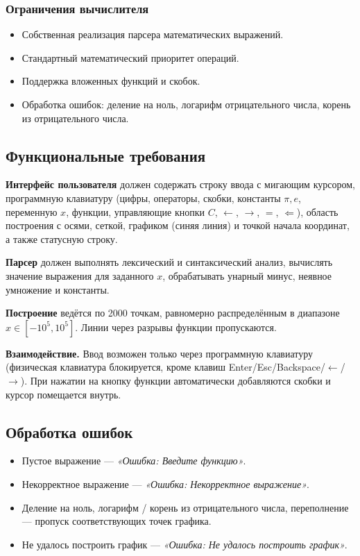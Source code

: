 \documentclass[a4paper, final]{article}
\begin{document}
\subsubsection*{Ограничения вычислителя}

\begin{itemize}
    \item Собственная реализация парсера математических выражений.
    \item Стандартный математический приоритет операций.
    \item Поддержка вложенных функций и скобок.
    \item Обработка ошибок: деление на ноль, логарифм отрицательного
          числа, корень из отрицательного числа.
\end{itemize}

\subsection{Функциональные требования}

\textbf{Интерфейс пользователя} должен содержать строку ввода
с мигающим курсором, программную клавиатуру (цифры, операторы, скобки,
константы $\pi, e$, переменную $x$, функции, управляющие кнопки
$C$, $\leftarrow$, $\to$, $=$, $\Leftarrow$), область построения
с осями, сеткой, графиком (синяя линия) и точкой начала координат,
а также статусную строку.

\textbf{Парсер} должен выполнять лексический и синтаксический анализ,
вычислять значение выражения для заданного $x$, обрабатывать унарный
минус, неявное умножение и константы.

\textbf{Построение} ведётся по 2000 точкам, равномерно распределённым
в диапазоне $x \in [-10^5, 10^5]$. Линии через разрывы функции
пропускаются.

\textbf{Взаимодействие.} Ввод возможен только через программную клавиатуру
(физическая клавиатура блокируется, кроме клавиш Enter/Esc/Backspace/$\leftarrow$/$\to$).
При нажатии на кнопку функции автоматически добавляются скобки и курсор
помещается внутрь.

\subsection{Обработка ошибок}

\begin{itemize}
    \item Пустое выражение --- \textit{«Ошибка: Введите функцию»}.
    \item Некорректное выражение --- \textit{«Ошибка: Некорректное выражение»}.
    \item Деление на ноль, логарифм / корень из отрицательного числа,
          переполнение --- пропуск соответствующих точек графика.
    \item Не удалось построить график --- \textit{«Ошибка: Не удалось
          построить график»}.
\end{itemize}
\end{document}

